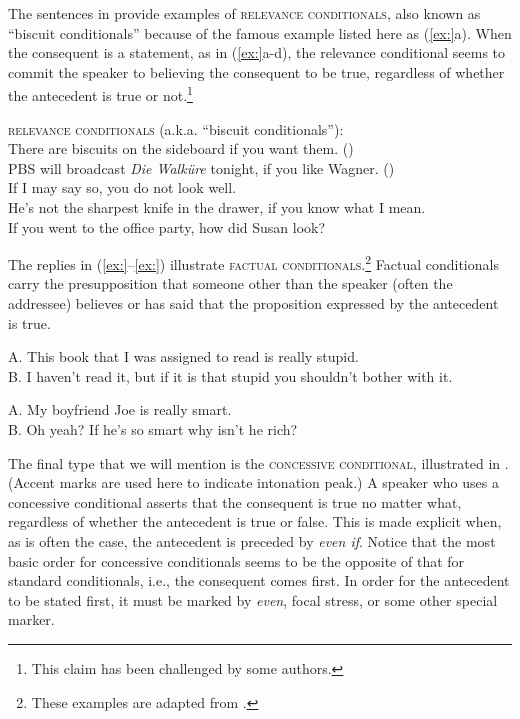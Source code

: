The sentences in  provide examples of \textsc{relevance} \textsc{conditionals}, also known as “biscuit conditionals” because of the famous example listed here as (\ref{ex:}a). When the consequent is a statement, as in (\ref{ex:}a-d), the relevance conditional seems to commit the speaker to believing the consequent to be true, regardless of whether the antecedent is true or not.\footnote{This claim has been challenged by some authors.}


\ea
\textsc{relevance} \textsc{conditionals} (a.k.a. “biscuit conditionals”):\\
\ea There are biscuits on the sideboard if you want them.  (\citealt{Austin1956})\\
\ex PBS will broadcast \textit{Die Walküre} tonight, if you like Wagner.  (\citealt{Bennett2003})\\
\ex If I may say so, you do not look well.\\
\ex He’s not the sharpest knife in the drawer, if you know what I mean.\\
\ex If you went to the office party, how did Susan look?
                       \z
\z


The replies in (\ref{ex:}--\ref{ex:}) illustrate \textsc{factual} \textsc{conditionals}.\footnote{These examples are adapted from   \citet[671]{BhattPancheva2006}.} Factual conditionals carry the presupposition that someone other than the speaker (often the addressee) believes or has said that the proposition expressed by the antecedent is true.


\ea
A. This book that I was assigned to read is really stupid.\\
B. I haven’t read it, but if it is that stupid you shouldn’t bother with it.
\z

\ea
A. My boyfriend Joe is really smart.\\
B. Oh yeah? If he’s so smart why isn’t he rich?
\z


The final type that we will mention is the \textsc{concessive conditional}, illustrated in . (Accent marks are used here to indicate intonation peak.) A speaker who uses a concessive conditional asserts that the consequent is true no matter what, regardless of whether the antecedent is true or false. This is made explicit when, as is often the case, the antecedent is preceded by \textit{even if}. Notice that the most basic order for concessive conditionals seems to be the opposite of that for standard conditionals, i.e., the consequent comes first. In order for the antecedent to be stated first, it must be marked by \textit{even}, focal stress, or some other special marker.


